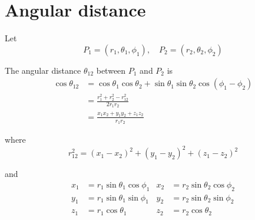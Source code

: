 

\section*{Angular distance}

Let
\begin{equation*}
P_1=(r_1,\theta_1,\phi_1),
\quad
P_2=(r_2,\theta_2,\phi_2)
\end{equation*}

The angular distance $\theta_{12}$ between $P_1$ and $P_2$ is
\begin{align*}
\cos\theta_{12}
&=\cos\theta_1\cos\theta_2+\sin\theta_1\sin\theta_2\cos(\phi_1-\phi_2)
\\
&=\frac{r_1^2+r_2^2-r_{12}^2}{2r_1r_2}
\\
&=\frac{x_1x_2+y_1y_2+z_1z_2}{r_1r_2}
\end{align*}

where
\begin{equation*}
r_{12}^2=(x_1-x_2)^2+(y_1-y_2)^2+(z_1-z_2)^2
\end{equation*}

and
\begin{align*}
x_1&=r_1\sin\theta_1\cos\phi_1 & x_2&=r_2\sin\theta_2\cos\phi_2
\\
y_1&=r_1\sin\theta_1\sin\phi_1 & y_2&=r_2\sin\theta_2\sin\phi_2
\\
z_1&=r_1\cos\theta_1 & z_2&=r_2\cos\theta_2
\end{align*}


